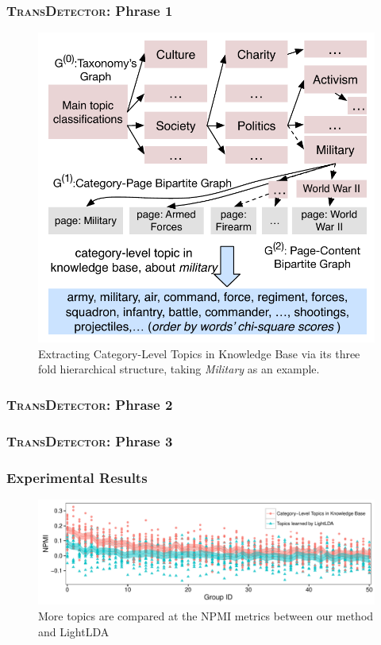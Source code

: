 \documentclass{beamer}
\begin{document}
\begin{frame}
\frametitle{\textsc{TransDetector}: Phrase 1}	
\begin{figure}[h]
		\setlength{\abovecaptionskip}{0.cm}
        \setlength{\belowcaptionskip}{0.cm}
        \centering
        \includegraphics[width=0.5\columnwidth]{../img/initializationExample.pdf}
        \caption{Extracting Category-Level Topics in Knowledge Base via its three fold hierarchical structure, taking \textit{Military} as an example.}
        \label{fig:hood}
\end{figure}

\end{frame}

\begin{frame}
\frametitle{\textsc{TransDetector}: Phrase 2}	

\end{frame}

\begin{frame}
\frametitle{\textsc{TransDetector}: Phrase 3}	

\end{frame}


\begin{frame}
\frametitle{Experimental Results}	
\begin{figure}[h]
	\setlength{\abovecaptionskip}{0.cm}
	\setlength{\belowcaptionskip}{0.cm}
        \centering
        \includegraphics[width=1.0\columnwidth]{../img/NPMI.pdf}
        \caption{More topics are compared at the NPMI metrics between our method and LightLDA}
        \label{fig:NPMI}
\end{figure}
\end{frame}
\end{document}
